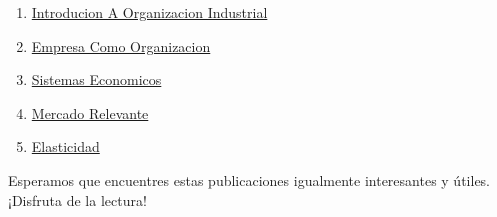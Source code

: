 \documentclass[
  man,
  floatsintext,
  longtable,
  a4paper,
  nolmodern,
  notxfonts,
  notimes,
  12pt,
  colorlinks=true,linkcolor=blue,citecolor=blue,urlcolor=blue]{apa7}
\providecommand{\tightlist}{%
  \setlength{\itemsep}{0pt}\setlength{\parskip}{0pt}}
\begin{document}
\begin{enumerate}
\def\labelenumi{\arabic{enumi}.}
\tightlist
\item
  \href{https://optimums.netlify.app/organizacion-industrial/2023-06-12-introducion-a-organizacion-industrial/index.pdf}{}
  \href{https://optimums.netlify.app/organizacion-industrial/2023-06-12-introducion-a-organizacion-industrial}{Introducion
  A Organizacion Industrial}
\item
  \href{https://optimums.netlify.app/organizacion-industrial/2023-06-13-empresa-como-organizacion/index.pdf}{}
  \href{https://optimums.netlify.app/organizacion-industrial/2023-06-13-empresa-como-organizacion}{Empresa
  Como Organizacion}
\item
  \href{https://optimums.netlify.app/organizacion-industrial/2023-06-13-sistemas-economicos/index.pdf}{}
  \href{https://optimums.netlify.app/organizacion-industrial/2023-06-13-sistemas-economicos}{Sistemas
  Economicos}
\item
  \href{https://optimums.netlify.app/organizacion-industrial/2023-06-15-mercado-relevante/index.pdf}{}
  \href{https://optimums.netlify.app/organizacion-industrial/2023-06-15-mercado-relevante}{Mercado
  Relevante}
\item
  \href{https://optimums.netlify.app/organizacion-industrial/2023-06-23-elasticidad/index.pdf}{}
  \href{https://optimums.netlify.app/organizacion-industrial/2023-06-23-elasticidad}{Elasticidad}
\end{enumerate}

Esperamos que encuentres estas publicaciones igualmente interesantes y
útiles. ¡Disfruta de la lectura!
\end{document}
